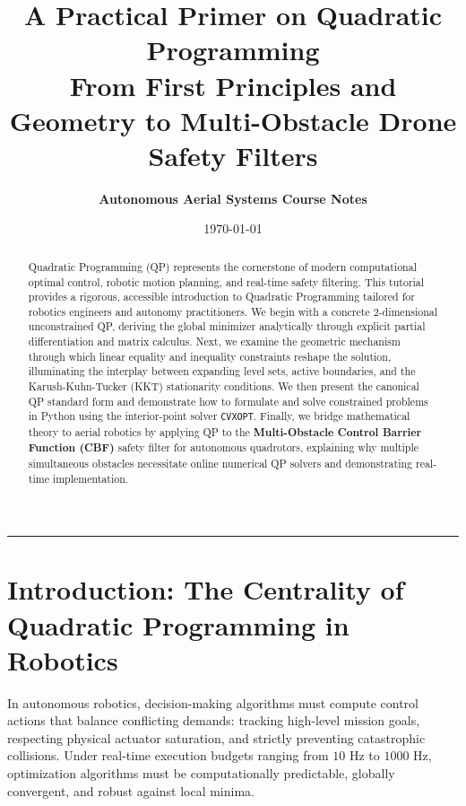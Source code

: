 \documentclass[11pt,a4paper]{article}
\title{\vspace{-1.5cm}\textbf{\Huge A Practical Primer on Quadratic Programming}\\[0.3cm]
\Large From First Principles and Geometry to Multi-Obstacle Drone Safety Filters}
\author{\textbf{Autonomous Aerial Systems Course Notes}}
\date{\today}
\begin{document}
\maketitle

\begin{abstract}
Quadratic Programming (QP) represents the cornerstone of modern computational optimal control, robotic motion planning, and real-time safety filtering. This tutorial provides a rigorous, accessible introduction to Quadratic Programming tailored for robotics engineers and autonomy practitioners. We begin with a concrete 2-dimensional unconstrained QP, deriving the global minimizer analytically through explicit partial differentiation and matrix calculus. Next, we examine the geometric mechanism through which linear equality and inequality constraints reshape the solution, illuminating the interplay between expanding level sets, active boundaries, and the Karush-Kuhn-Tucker (KKT) stationarity conditions. We then present the canonical QP standard form and demonstrate how to formulate and solve constrained problems in Python using the interior-point solver \texttt{CVXOPT}. Finally, we bridge mathematical theory to aerial robotics by applying QP to the \textbf{Multi-Obstacle Control Barrier Function (CBF)} safety filter for autonomous quadrotors, explaining why multiple simultaneous obstacles necessitate online numerical QP solvers and demonstrating real-time implementation.
\end{abstract}

\tableofcontents
\vspace{0.5cm}
\hrule
\vspace{0.8cm}

\section{Introduction: The Centrality of Quadratic Programming in Robotics}

In autonomous robotics, decision-making algorithms must compute control actions that balance conflicting demands: tracking high-level mission goals, respecting physical actuator saturation, and strictly preventing catastrophic collisions. Under real-time execution budgets ranging from $10\text{ Hz}$ to $1000\text{ Hz}$, optimization algorithms must be computationally predictable, globally convergent, and robust against local minima.
\end{document}
